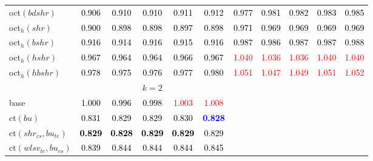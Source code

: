 \begin{tabular}[t]{l|>{}cccc>{}c|ccccc}
oct$(bdshr)$ & \textcolor{black}{0.906} & \textcolor{black}{0.910} & \textcolor{black}{0.910} & \textcolor{black}{0.911} & \textcolor{black}{0.912} & \textcolor{black}{0.977} & \textcolor{black}{0.981} & \textcolor{black}{0.982} & \textcolor{black}{0.983} & \textcolor{black}{0.985}\\
oct$_h(shr)$ & \textcolor{black}{0.900} & \textcolor{black}{0.898} & \textcolor{black}{0.898} & \textcolor{black}{0.897} & \textcolor{black}{0.898} & \textcolor{black}{0.971} & \textcolor{black}{0.969} & \textcolor{black}{0.969} & \textcolor{black}{0.969} & \textcolor{black}{0.969}\\
oct$_h(bshr)$ & \textcolor{black}{0.916} & \textcolor{black}{0.914} & \textcolor{black}{0.916} & \textcolor{black}{0.915} & \textcolor{black}{0.916} & \textcolor{black}{0.987} & \textcolor{black}{0.986} & \textcolor{black}{0.987} & \textcolor{black}{0.987} & \textcolor{black}{0.988}\\
oct$_h(hshr)$ & \textcolor{black}{0.967} & \textcolor{black}{0.964} & \textcolor{black}{0.964} & \textcolor{black}{0.966} & \textcolor{black}{0.967} & \textcolor{red}{1.040} & \textcolor{red}{1.036} & \textcolor{red}{1.036} & \textcolor{red}{1.040} & \textcolor{red}{1.040}\\
oct$_h(hbshr)$ & \textcolor{black}{0.978} & \textcolor{black}{0.975} & \textcolor{black}{0.976} & \textcolor{black}{0.977} & \textcolor{black}{0.980} & \textcolor{red}{1.051} & \textcolor{red}{1.047} & \textcolor{red}{1.049} & \textcolor{red}{1.051} & \textcolor{red}{1.052}\\
\addlinespace[0.3em]
\multicolumn{1}{c}{} & \multicolumn{5}{c}{\textbf{$k = 2$}} & \multicolumn{5}{c}{}\\
base & \textcolor{black}{1.000} & \textcolor{black}{0.996} & \textcolor{black}{0.998} & \textcolor{red}{1.003} & \textcolor{red}{1.008} &  &  &  &  & \\
ct$(bu)$ & \textcolor{black}{0.831} & \textcolor{black}{0.829} & \textcolor{black}{0.829} & \textcolor{black}{0.830} & \textcolor{blue}{\textbf{0.828}} &  &  &  &  & \\
ct$(shr_{cs}, bu_{te})$ & \textcolor{black}{\textbf{0.829}} & \textcolor{black}{\textbf{0.828}} & \textcolor{black}{\textbf{0.829}} & \textcolor{black}{\textbf{0.829}} & \textcolor{black}{0.829} &  &  &  &  & \\
ct$(wlsv_{te}, bu_{cs})$ & \textcolor{black}{0.839} & \textcolor{black}{0.844} & \textcolor{black}{0.844} & \textcolor{black}{0.844} & \textcolor{black}{0.845} &  &  &  &  & \\

\end{tabular}
